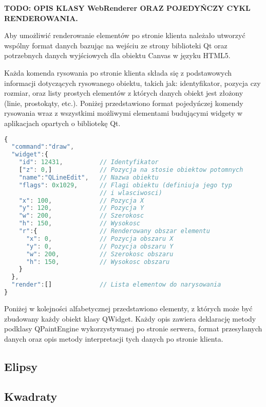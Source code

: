 \bf{TODO: OPIS KLASY WebRenderer ORAZ POJEDYŃCZY CYKL RENDEROWANIA.}

Aby umożliwić renderowanie elementów po stronie klienta należało utworzyć wspólny format danych bazując na wejściu ze strony biblioteki Qt oraz potrzebnych danych wyjściowych dla obiektu Canvas w języku HTML5. 

Każda komenda rysowania po stronie klienta składa się z podstawowych informacji dotyczących rysowanego obiektu, takich jak: identyfikator, pozycja czy rozmiar, oraz listy prostych elementów z których danych obiekt jest złożony (linie, prostokąty, etc.). Poniżej przedstawiono format pojedyńczej komendy rysowania wraz z wszystkimi możliwymi elementami budującymi widgety w aplikacjach opartych o bibliotekę Qt.


\begin{lstlisting}[language=JavaScript,numbers=none,caption=Komenda renderowania elementu interfejsu]
{
  "command":"draw",
  "widget":{
    "id": 12431,          // Identyfikator
    ["z": 0,]             // Pozycja na stosie obiektow potomnych
    "name":"QLineEdit",   // Nazwa obiektu
    "flags": 0x1029,      // Flagi obiektu (definiuja jego typ 
                          // i wlasciwosci)
    "x": 100,             // Pozycja X
    "y": 120,             // Pozycja Y
    "w": 200,             // Szerokosc
    "h": 150,             // Wysokosc
    "r":{                 // Renderowany obszar elementu
      "x": 0,             // Pozycja obszaru X
      "y": 0,             // Pozycja obszaru Y
      "w": 200,           // Szerokosc obszaru
      "h": 150,           // Wysokosc obszaru
    }
  },
  "render":[]             // Lista elementow do narysowania
}
\end{lstlisting}

Poniżej w kolejności alfabetycznej przedstawiono elementy, z których może być zbudowany każdy obiekt klasy QWidget. Każdy opis zawiera deklarację metody podklasy QPaintEngine wykorzystywanej po stronie serwera, format przesyłanych danych oraz opis metody interpretacji tych danych po stronie klienta.

\subsection{Elipsy}


\subsection{Kwadraty}


